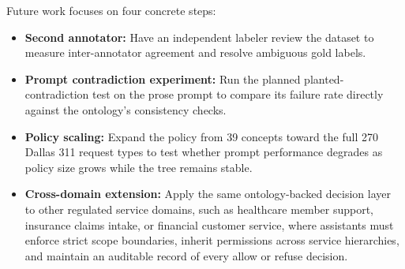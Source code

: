 \documentclass[conference]{IEEEtran}
\begin{document}
Future work focuses on four concrete steps:
\begin{itemize}
    \item \textbf{Second annotator:} Have an independent labeler review the dataset to measure inter-annotator agreement and resolve ambiguous gold labels.
    \item \textbf{Prompt contradiction experiment:} Run the planned planted-contradiction test on the prose prompt to compare its failure rate directly against the ontology's consistency checks.
    \item \textbf{Policy scaling:} Expand the policy from 39 concepts toward the full 270 Dallas 311 request types to test whether prompt performance degrades as policy size grows while the tree remains stable.
    \item \textbf{Cross-domain extension:} Apply the same ontology-backed decision layer to other regulated service domains, such as healthcare member support, insurance claims intake, or financial customer service, where assistants must enforce strict scope boundaries, inherit permissions across service hierarchies, and maintain an auditable record of every allow or refuse decision.
\end{itemize}

\vspace{0.5em}



\end{document}
